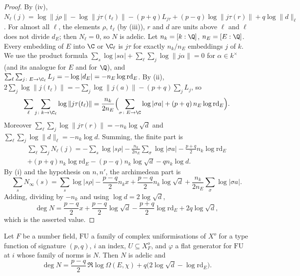 \begin{proof}
By (iv), $N_\ell(j)=\log\|j\rho\|-\log\|j\tau(t_\ell)\|-(p+q)L_{j\tau}+(p-q)\log\|j\tau(r)\|+q\log\|d\|_\ell$.
For almost all $\ell$, the elements $\rho$, $t_\ell$ (by (iii)), $r$ and $d$ are units above $\ell$ and $\ell$
does not divide $d_E$; then $N_\ell=0$, so $N$ is adelic. Let $n_k=[k:\Q]$, $n_E=[E:\Q]$. Every embedding of
$E$ into $\C$ or $\C_\ell$ is $j\tau$ for exactly $n_k/n_E$ embeddings $j$ of $k$. We use the product formula
$\sum_s\log|s\alpha|+\sum_\ell\sum_j\log\|j\alpha\|=0$ for $\alpha\in k^\times$ (and its analogue for $E$ and
for $\Q$), and $\sum_\ell\sum_{j\colon E\to\C_\ell}L_j=-\log|d_E|=-n_E\log\mathrm{rd}_E$. By (ii),
$2\sum_j\log\|j(t_\ell)\|=-\sum_j\log\|j(a)\|-(p+q)\sum_jL_j$, so
\[
\sum_\ell\sum_{j\colon k\to\C_\ell}\log\|j\tau(t_\ell)\|=\frac{n_k}{2n_E}\Bigl(\sum_{\sigma\colon E\to\C}\log|\sigma a|
+(p+q)\,n_E\log\mathrm{rd}_E\Bigr).
\]
Moreover $\sum_\ell\sum_j\log\|j\tau(r)\|=-n_k\log\sqrt d$ and $\sum_\ell\sum_j\log\|d\|_\ell=-n_k\log d$.
Summing, the finite part is
\begin{multline*}
\sum_\ell\sum_jN_\ell(j)=-\sum_s\log|s\rho|-\frac{n_k}{2n_E}\sum_\sigma\log|\sigma a|-\frac{p+q}2n_k\log\mathrm{rd}_E\\
+(p+q)n_k\log\mathrm{rd}_E-(p-q)n_k\log\sqrt d-qn_k\log d .
\end{multline*}
By (i) and the hypothesis on $n,n'$, the archimedean part is
\[
\sum_sN_\infty(s)=\sum_s\log|s\rho|-\frac{p-q}2n_kx+\frac{p-q}2n_k\log\sqrt d+\frac{n_k}{2n_E}\sum_\sigma\log|\sigma a|.
\]
Adding, dividing by $-n_k$ and using $\log d=2\log\sqrt d$,
\[
\deg N=\frac{p-q}2x+\frac{p-q}2\log\sqrt d-\frac{p+q}2\log\mathrm{rd}_E+2q\log\sqrt d,
\]
which is the asserted value.
\end{proof}

\begin{theorem}\label{pf:covol:thm:flatdeg}
Let $F$ be a number field, $\mathrm{FU}$ a family of complex uniformisations of $X^o$ for a type function of
signature $(p,q)$, $i$ an index, $U\subseteq X^o_F$, and $\varphi$ a flat generator for $\mathrm{FU}$ at $i$
whose family of norms is $N$. Then $N$ is adelic and
\[
\deg N=\frac{p-q}2\,\Re\log\Omega(E,\chi)+q\bigl(2\log\sqrt d-\log\mathrm{rd}_E\bigr).
\]
\end{theorem}

